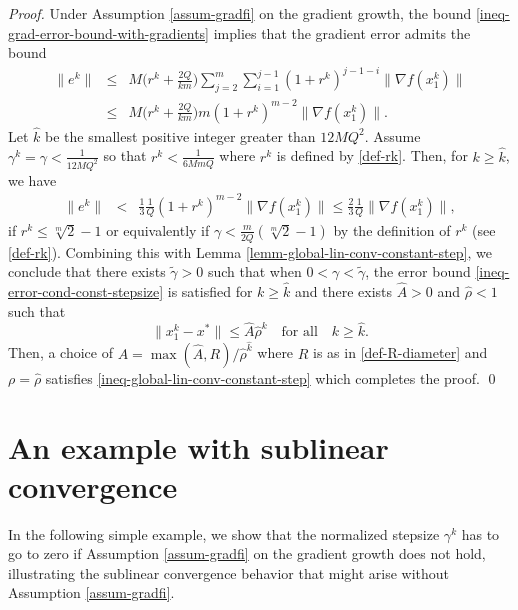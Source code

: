 \documentclass[final,numbook]{svjour3}
\begin{document}
\begin{proof} Under Assumption \ref{assum-gradfi} on the gradient growth, the bound \eqref{ineq-grad-error-bound-with-gradients} implies that the gradient error admits the bound
   \begin{eqnarray*} \| e^k \| &\leq & M \bigg( r^k + \frac{2Q}{km}\bigg) \sum_{j=2}^m  \sum_{i=1}^{j-1} (1 + r^k)^{j-1 - i} \| \nabla f (x_1^k)\| \\
    &\leq & M  \bigg( r^k + \frac{2Q}{km}\bigg)  m(1 + r^k)^{m-2} \| \nabla f (x_1^k)\|.
   \end{eqnarray*}
Let ${\hat{k}}$ be the smallest positive integer greater than $12MQ^2$. Assume $\gamma^k = \gamma < \frac{1}{12MQ^2}$ so that $r^k < \frac{1}{6MmQ}$ where $r^k$ is defined by \eqref{def-rk}. Then, for $k\geq {\hat{k}}$, we have 
 \begin{eqnarray}\label{ineq-error-cond-const-stepsize} \| e^k \| & < & \frac{1}{3}\frac{1}{Q}(1 + r^k)^{m-2} \| \nabla f (x_1^k)\| 
      \leq  \frac{2}{3}\frac{1}{Q}\| \nabla f (x_1^k)\|,
   \end{eqnarray}
if $r^k\leq \sqrt[m]{2}-1$ or equivalently if $\gamma < \frac{m}{2Q}(\sqrt[m]{2}-1)$ by the definition of $r^k$ (see \eqref{def-rk}). 
Combining this with Lemma \ref{lemm-global-lin-conv-constant-step}, we conclude that there exists $\widetilde{\gamma}>0$ such that when $0 <\gamma < \widetilde{\gamma}$, the error bound \eqref{ineq-error-cond-const-stepsize} is satisfied for $k\geq {\hat{k}}$ and there exists ${\hat{A}}>0$ and ${\hat{\rho}}<1$ such that
   $$\|x_1^k - x^*\| \leq {\hat{A}} {\hat{\rho}}^k \quad \mbox{for all} \quad k \geq {\hat{k}}.$$
Then, a choice of $A= \max({\hat{A}},R)/{{\hat{\rho}}^{\hat{k}}}$ where $R$ is as in \eqref{def-R-diameter} and $\rho={\hat{\rho}}$ satisfies \eqref{ineq-global-lin-conv-constant-step} which completes the proof. \qed
\end{proof}

\section{An example with sublinear convergence}
\label{sec-examples-sublinear-conv} 
	

In the following simple example, we show that 
the normalized stepsize $\gamma^k$ has to go to zero if Assumption \ref{assum-gradfi} on the gradient growth does not hold, illustrating the sublinear convergence behavior that might arise without Assumption \ref{assum-gradfi}. 
\end{document}
